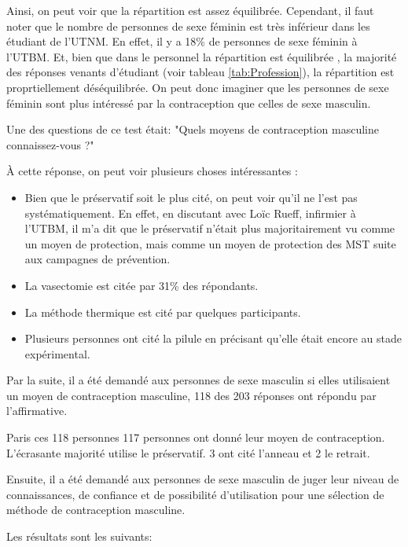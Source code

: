 \documentclass[12pt,a4paper]{report}
\begin{document}
Ainsi, on peut voir que la répartition est assez équilibrée. Cependant, il faut noter que le nombre de personnes de sexe féminin est très inférieur dans les étudiant de l'UTNM.
En effet, il y a 18\% de personnes de sexe féminin à l'UTBM. \cite{UTBMClassementEcoles}
Et, bien que dans le personnel la répartition est équilibrée \cite{RapportSocial20202020}, la majorité des réponses venants d'étudiant (voir tableau \ref{tab:Profession}), la répartition est proprtiellement déséquilibrée.
On peut donc imaginer que les personnes de sexe féminin sont plus intéressé par la contraception que celles de sexe masculin.

Une des questions de ce test était: "Quels moyens de contraception masculine connaissez-vous ?"

À cette réponse, on peut voir plusieurs choses intéressantes :
\begin{itemize}
    \item Bien que le préservatif soit le plus cité, on peut voir qu'il ne l'est pas systématiquement. En effet, en discutant avec Loïc Rueff, infirmier à l'UTBM, il m'a dit que le préservatif n'était plus majoritairement vu comme un moyen de protection, mais comme un moyen de protection des MST suite aux campagnes de prévention.
    \item La vasectomie est citée par 31\% des répondants.
    \item La méthode thermique est cité par quelques participants.
    \item Plusieurs personnes ont cité la pilule en précisant qu'elle était encore au stade expérimental.
\end{itemize}

Par la suite, il a été demandé aux personnes de sexe masculin si elles utilisaient un moyen de contraception masculine, 118 des 203 réponses ont répondu par l'affirmative.

Paris ces 118 personnes 117 personnes ont donné leur moyen de contraception. L'écrasante majorité utilise le préservatif.
3 ont cité l'anneau et 2 le retrait.

Ensuite, il a été demandé aux personnes de sexe masculin de juger leur niveau de connaissances, de confiance et de possibilité d'utilisation pour une sélection de méthode de contraception masculine.

Les résultats sont les suivants:
\end{document}
